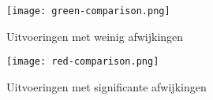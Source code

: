 \begin{figure}[h]
  \centering
  \begin{minipage}{0.45\textwidth}
      \centering
      \texttt{[image: green-comparison.png]}
      \caption[Weinig afwijking]{\label{fig:green_comparison}Uitvoeringen met weinig afwijkingen}
  \end{minipage}
  \hfill %
  \begin{minipage}{0.45\textwidth}
      \centering
      \texttt{[image: red-comparison.png]}
      \caption[significante afwijking]{\label{fig:red_comparison}Uitvoeringen met significante afwijkingen}
  \end{minipage}
\end{figure}   
